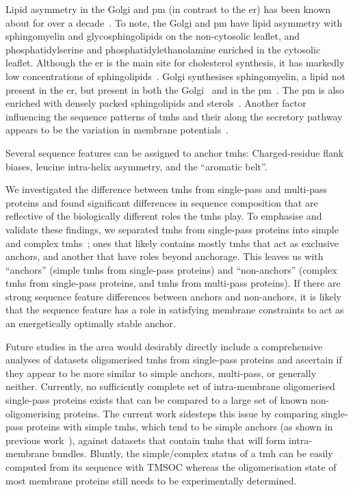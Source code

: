 Lipid asymmetry in the Golgi and \gls{pm} (in contrast to the \gls{er}) has been known about for over a decade~\cite{Daleke2007, Devaux2004}.
To note, the Golgi and \gls{pm} have lipid asymmetry with sphingomyelin and glycosphingolipids on the non-cytosolic leaflet, and phosphatidylserine and phosphatidylethanolamine enriched in the cytosolic leaflet.
Although the \gls{er} is the main site for cholesterol synthesis, it has markedly low concentrations of sphingolipids~\cite{Bell1981}.
Golgi synthesises sphingomyelin, a lipid not present in the \gls{er}, but present in both the Golgi~\cite{Futerman2005} and in the \gls{pm}~\cite{Li2007, Tafesse2007}.
The \gls{pm} is also enriched with densely packed sphingolipids and sterols~\cite{Paolo2006}.
Another factor influencing the sequence patterns of \gls{tmh}s and their along the secretory pathway appears to be the variation in membrane potentials~\cite{Qin2011, Worley1994, Schapiro2000}.

Several sequence features can be assigned to anchor \gls{tmh}s: Charged-residue flank biases, leucine intra-helix asymmetry, and the ``aromatic belt''.

We investigated the difference between \gls{tmh}s from single-pass and multi-pass proteins and found significant differences in sequence composition that are reflective of the biologically different roles the \gls{tmh}s play.
To emphasise and validate these findings, we separated \gls{tmh}s from single-pass proteins into simple and complex \gls{tmh}s~\cite{Wong2011, Wong2012}; ones that likely contains mostly \gls{tmh}s that act as exclusive anchors, and another that have roles beyond anchorage.
This leaves us with ``anchors'' (simple \gls{tmh}s from single-pass proteins) and ``non-anchors'' (complex \gls{tmh}s from single-pass proteins, and \gls{tmh}s from multi-pass proteins).
If there are strong sequence feature differences between anchors and non-anchors, it is likely that the sequence feature has a role in satisfying membrane constraints to act as an energetically optimally stable anchor.

Future studies in the area would desirably directly include a comprehensive analyses of datasets oligomerised \gls{tmh}s from single-pass proteins and ascertain if they appear to be more similar to simple anchors, multi-pass, or generally neither.
Currently, no sufficiently complete set of intra-membrane oligomerised single-pass proteins exists that can be compared to a large set of known non-oligomerising proteins.
The current work sidesteps this issue by comparing single-pass proteins with simple \gls{tmh}s, which tend to be simple anchors (as shown in previous work~\cite{Wong2011, Wong2012}), against datasets that contain \gls{tmh}s that will form intra-membrane bundles.
Bluntly, the simple/complex status of a \gls{tmh} can be easily computed from its sequence with TMSOC whereas the oligomerisation state of most membrane proteins still needs to be experimentally determined.

